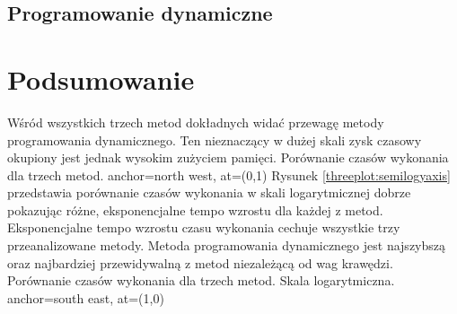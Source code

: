 \documentclass[12pt]{article}
\begin{document}

\subsection{Programowanie dynamiczne}

\section{Podsumowanie}
Wśród wszystkich trzech metod dokładnych widać przewagę metody programowania dynamicznego. Ten nieznaczący w dużej skali zysk czasowy okupiony jest jednak wysokim zużyciem pamięci.
{Porównanie czasów wykonania dla trzech metod.}
{anchor=north west, at={(0,1)}}
Rysunek \ref{threeplot:semilogyaxis} przedstawia porównanie czasów wykonania w skali logarytmicznej dobrze pokazując różne, eksponencjalne tempo wzrostu dla każdej z metod. Eksponencjalne tempo wzrostu czasu wykonania cechuje wszystkie trzy przeanalizowane metody. Metoda programowania dynamicznego jest najszybszą oraz najbardziej przewidywalną z metod niezależącą od wag krawędzi.
{Porównanie czasów wykonania dla trzech metod. Skala logarytmiczna.}
{anchor=south east, at={(1,0)}}
\end{document}
